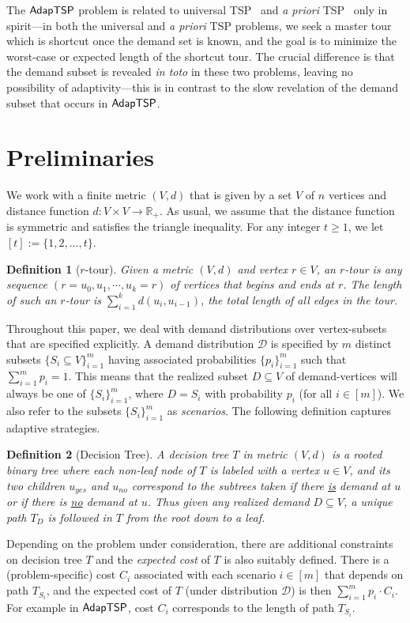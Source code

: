 \documentclass[11pt]{article}
\newtheorem{definition}{Definition}
\def\sse{\subseteq}
\def\ds{\mathcal{D}}
\def\stsp{\ensuremath{{\sf AdapTSP}}\xspace}
\begin{document}
The \stsp problem is related to universal TSP~\cite{jlnrs,ghr} and {\em
  a priori} TSP~\cite{jaillet,ss08,st08} only in spirit---in both the
universal and \emph{a priori} TSP problems, we seek a master tour which is shortcut once the demand set is known, and
the goal is to minimize the worst-case or expected length of the shortcut tour. The crucial difference is that the
demand subset is revealed {\em in toto} in these two problems, leaving no possibility of adaptivity---this is in
contrast to the slow revelation of the demand subset that occurs in \stsp.



\section{Preliminaries}\label{sec:prelim}
We work with a  finite metric $(V,d)$ that is given by a set $V$ of $n$ vertices and distance function $d:V\times V\rightarrow \mathbb{R}_+$. 
As usual, we assume that the distance function is symmetric and satisfies the triangle inequality. For any
integer $t\ge 1$, we let $[t]:=\{1,2,\ldots,t\}$.


\begin{definition}[$r$-tour]
Given a metric $(V,d)$ and vertex $r\in V$, an \emph{$r$-tour} is any sequence $(r=u_0,u_1,\cdots,u_k=r)$ of vertices that  begins and ends at $r$. The length of such an $r$-tour is $\sum_{i=1}^k d(u_{i},u_{i-1})$, the total length of all edges in the tour. 
\end{definition}


Throughout this paper, we deal with demand distributions over vertex-subsets that are specified explicitly. A demand
distribution $\ds$ is specified by $m$ distinct subsets $\{S_i\sse V\}_{i=1}^m$ having associated probabilities
$\{p_i\}_{i=1}^m$ such that $\sum_{i=1}^m p_i=1$. This means that the realized subset $D\sse V$ of demand-vertices will
always be one of $\{S_i\}_{i=1}^m$, where $D=S_i$ with probability $p_i$ (for all $i\in [m]$). We also refer to the
subsets $\{S_i\}_{i=1}^m$ as {\em scenarios}. The following definition captures adaptive strategies.

\smallskip
\begin{definition}[Decision Tree]
  \label{def:dt}
  A decision tree $T$ in metric $(V,d)$ is a
  rooted binary tree where each non-leaf node of $T$ is labeled with a vertex $u\in V$,
    and its two children $u_{yes}$ and $u_{no}$ correspond to the
    subtrees taken if there \underline{is} demand at $u$ or if there is \underline{no} demand at $u$.
Thus given any realized demand $D\sse V$, a unique path $T_{D}$ is followed in $T$ from the root down to a leaf.
\end{definition}
Depending on the problem under consideration, there are additional constraints on decision tree $T$ and the
\emph{expected cost} of $T$ is also suitably defined.  There is a (problem-specific) cost $C_i$ associated with each
scenario $i\in [m]$ that depends on path $T_{S_i}$, and the expected cost of $T$ (under distribution $\ds$) is then
$\sum_{i=1}^m p_i\cdot C_i$. For example in \stsp, cost $C_i$ corresponds to the length of path $T_{S_i}$. 
\end{document}
